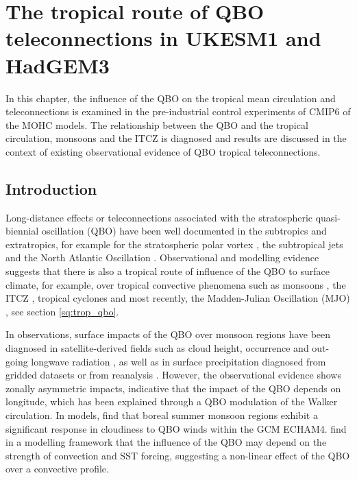 \chapter{\label{ch:7-qbo} The tropical route of QBO teleconnections in UKESM1 and HadGEM3 }

In this chapter, the influence of the QBO on the tropical mean circulation and teleconnections is examined in the pre-industrial control experiments of CMIP6 of the MOHC models. The relationship between the QBO and the tropical circulation, monsoons and the ITCZ is diagnosed and results are discussed in the context of existing observational evidence of QBO tropical teleconnections. 


\section{Introduction}

Long-distance effects or teleconnections associated with the stratospheric quasi-biennial oscillation (QBO) have been well documented in the subtropics and extratropics, for example for the stratospheric polar vortex \citep{holton1980,anstey2014,lu2020}, the subtropical jets \citep{garfinkel2011,hansen2016tropospheric} and the North Atlantic Oscillation \citep{hansen2016tropospheric,gray2018,andrews2019observed}.  
 Observational and modelling evidence suggests that there is also a tropical route of influence of the QBO to surface climate, for example, over tropical convective phenomena such as monsoons \citep{giorgetta1999,liess2012}, the ITCZ \citep{gray2018}, tropical cyclones \citep{gray1984,chan1995} and most recently, the Madden-Julian Oscillation (MJO) \citep{lee2018,wang2019,martin2020jgr}, see section \ref{sq:trop_qbo}. 
 
In observations, surface impacts of the QBO over monsoon regions have been diagnosed in satellite-derived fields such as cloud height, occurrence and out-going longwave radiation \citep{collimore2003,liess2012}, as well as in surface precipitation diagnosed from gridded datasets or from reanalysis \citep{gray2018}.
However,  the observational evidence shows zonally asymmetric impacts, indicative that the impact of the QBO depends on longitude, which has been explained \citep[e.g. by][]{collimore2003,liess2012} through a QBO modulation of the Walker circulation.
In models,  \cite{giorgetta1999} find that boreal summer monsoon regions exhibit a significant response in cloudiness to QBO winds within the GCM ECHAM4. 
\cite{nie2015} find in a modelling framework that the influence of the QBO may depend on the strength of convection and SST forcing, suggesting a non-linear effect of the QBO over a convective profile.


